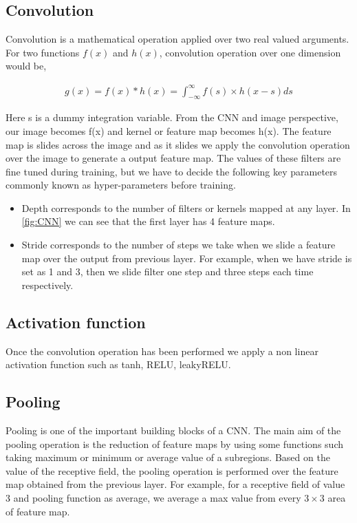 \subsection{Convolution}

Convolution is a mathematical operation applied over two real valued arguments. For two functions $f(x)$ and $h(x)$, convolution operation over one dimension would be,

 \begin{equation}\label{eq:convolution-1d}
        \begin{aligned}
            g(x)=f(x) \ast h(x) = \int_{-\infty }^{\infty} f(s) \times h(x-s) ds
        \end{aligned}
\end{equation}

Here s is a dummy integration variable. 
From the CNN and image perspective, our image becomes f(x) and kernel or feature map becomes h(x). The feature map is slides across the image and as it slides we apply the convolution operation over the image to generate a output feature map. The values of these filters are fine tuned during training, but we have to decide the following key parameters commonly known as hyper-parameters before training.
\begin{itemize}
    \item  Depth corresponds to the number of filters or kernels mapped at any layer. In \cref{fig:CNN} we can see that the first layer has 4 feature maps.
    \item Stride corresponds to the number of steps we take when we slide a feature map over the output from previous layer. For example, when we have stride is set as 1 and 3, then we slide filter one step and three steps each time respectively.
\end{itemize}

\subsection{ Activation function}
Once the convolution operation has been performed we apply a non linear activation function such as tanh, RELU, leakyRELU.

\subsection{Pooling}
Pooling is one of the important building blocks of a CNN. The main aim of the pooling operation is the reduction of feature maps by using some functions such taking maximum or minimum or average value of a subregions. Based on the value of the receptive field, the pooling operation is performed over the feature map obtained from the previous layer. For example, for a receptive field of value 3 and pooling function as average, we average a max value from every $3 \times 3$ area of feature map.

